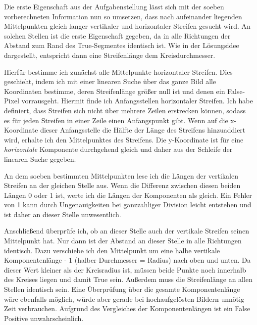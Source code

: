 Die erste Eigenschaft aus der Aufgabenstellung lässt sich mit der soeben vorberechneten Information nun so umsetzen, dass nach aufeinander liegenden Mittelpunkten gleich langer vertikaler und horizontaler Streifen gesucht wird. An solchen Stellen ist die erste Eigenschaft gegeben, da in alle Richtungen der Abstand zum Rand des True-Segmentes identisch ist. Wie in der Lösungsidee dargestellt, entspricht dann eine Streifenlänge dem Kreisdurchmesser.

Hierfür bestimme ich zunächst alle Mittelpunkte horizontaler Streifen. Dies geschieht, indem ich mit einer linearen Suche über das ganze Bild alle Koordinaten bestimme, deren Streifenlänge größer null ist und denen ein False-Pixel vorrausgeht. Hiermit finde ich Anfangsstellen horizontaler Streifen. Ich habe definiert, dass Streifen sich nicht über mehrere Zeilen erstrecken können, sodass es für jeden Streifen in einer Zeile einen Anfangspunkt gibt.
Wenn auf die x-Koordinate dieser Anfangsstelle die Hälfte der Länge des  Streifens hinzuaddiert wird, erhalte ich den Mittelpunktes des Streifens. Die y-Koordinate ist für eine \textit{horizontale} Komponente durchgehend gleich und daher aus der Schleife der linearen Suche gegeben.

An dem soeben bestimmten Mittelpunkten lese ich die Längen der vertikalen Streifen an der gleichen Stelle aus. Wenn die Differenz zwischen diesen beiden Längen 0 oder 1 ist, werte ich die Längen der Komponenten als gleich. Ein Fehler von 1 kann durch Ungenauigkeiten bei ganzzahliger Division leicht entstehen und ist daher an dieser Stelle unwesentlich.

Anschließend überprüfe ich, ob an dieser Stelle auch der vertikale Streifen seinen Mittelpunkt hat. Nur dann ist der Abstand an dieser Stelle in alle Richtungen identisch. Dazu verschiebe ich den Mittelpunkt um eine halbe vertikale Komponentenlänge - 1 (halber Durchmesser = Radius) nach oben und unten. Da dieser Wert kleiner als der Kreisradius ist, müssen beide Punkte noch innerhalb des Kreises liegen und damit True sein. Außerdem muss die Streifenlänge an allen Stellen identisch sein.
Eine Überprüfung über die gesamte Komponentenlänge wäre ebenfalls möglich, würde aber gerade bei hochaufgelösten Bildern unnötig Zeit verbrauchen. Aufgrund des Vergleiches der Komponentenlängen ist ein False Positive unwahrscheinlich.

